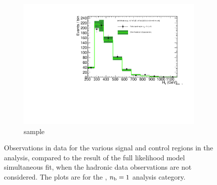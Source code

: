 \begin{figure}[h!]
\begin{subfigure}[b]{0.48\textwidth}
    \includegraphics[width=\textwidth,page=6]
    {Figs/results/v0/greenBand/bestFit_2012dev_RQcdZero_fZinvAll_1b_ge4j-12p_smOnly}
    \caption{\gj sample}
  \end{subfigure}
  \caption{Observations in data for the various signal and control
  regions in the analysis, compared to the result of the full likelihood model
  simultaneous fit, when the hadronic data observations are not considered. The
  plots are for the \njhigh, $n_{\text{b}} = 1$ analysis category.}
  \label{fig:green_fits_1b_ge4j}
\end{figure}

